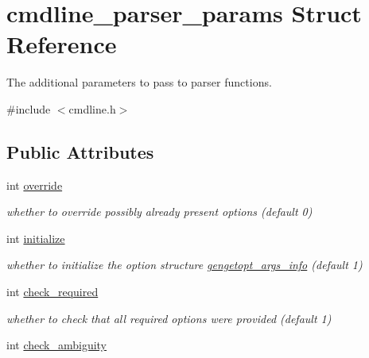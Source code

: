 \hypertarget{structcmdline__parser__params}{}\section{cmdline\+\_\+parser\+\_\+params Struct Reference}
\label{structcmdline__parser__params}


The additional parameters to pass to parser functions.  




{\ttfamily \#include $<$cmdline.\+h$>$}

\subsection*{Public Attributes}
\begin{DoxyCompactItemize}
\item 
\hypertarget{structcmdline__parser__params_ad3ff9d69146e69a47506782197b5675c}{}int \hyperlink{structcmdline__parser__params_ad3ff9d69146e69a47506782197b5675c}{override}\label{structcmdline__parser__params_ad3ff9d69146e69a47506782197b5675c}

\begin{DoxyCompactList}\small\item\em whether to override possibly already present options (default 0) \end{DoxyCompactList}\item 
\hypertarget{structcmdline__parser__params_a97ed8a6eabd39291ae7d73f273e12c11}{}int \hyperlink{structcmdline__parser__params_a97ed8a6eabd39291ae7d73f273e12c11}{initialize}\label{structcmdline__parser__params_a97ed8a6eabd39291ae7d73f273e12c11}

\begin{DoxyCompactList}\small\item\em whether to initialize the option structure \hyperlink{structgengetopt__args__info}{gengetopt\+\_\+args\+\_\+info} (default 1) \end{DoxyCompactList}\item 
\hypertarget{structcmdline__parser__params_a44ff439d7e9e36799e59173af74829c6}{}int \hyperlink{structcmdline__parser__params_a44ff439d7e9e36799e59173af74829c6}{check\+\_\+required}\label{structcmdline__parser__params_a44ff439d7e9e36799e59173af74829c6}

\begin{DoxyCompactList}\small\item\em whether to check that all required options were provided (default 1) \end{DoxyCompactList}\item 
\hypertarget{structcmdline__parser__params_a6e4442704fc40b0b655f7cc602f13ec4}{}int \hyperlink{structcmdline__parser__params_a6e4442704fc40b0b655f7cc602f13ec4}{check\+\_\+ambiguity}\label{structcmdline__parser__params_a6e4442704fc40b0b655f7cc602f13ec4}


\end{DoxyCompactItemize}
